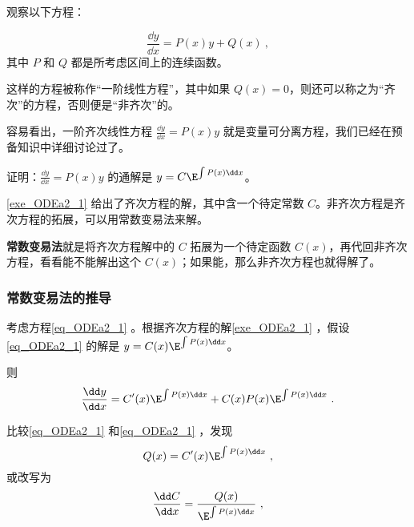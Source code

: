 

观察以下方程：

\begin{equation}\label{eq_ODEa2_1}
\frac{\dd y}{\dd x}=P(x)y+Q(x)~,
\end{equation}
其中 $P$ 和 $Q$ 都是所考虑区间上的连续函数。

这样的方程被称作“一阶线性方程”，其中如果 $Q(x)=0$，则还可以称之为“齐次”的方程，否则便是“非齐次”的。

容易看出，一阶齐次线性方程 $\frac{\dd y}{\dd x}=P(x)y$ 就是变量可分离方程，我们已经在预备知识中详细讨论过了。

\begin{exercise}{}\label{exe_ODEa2_1}
证明：$\frac{\dd y}{\dd x}=P(x)y$ 的通解是 $y=C\E^{\int P(x)\dd x}$。
\end{exercise}

\autoref{exe_ODEa2_1} 给出了齐次方程的解，其中含一个待定常数 $C$。非齐次方程是齐次方程的拓展，可以用常数变易法来解。

\textbf{常数变易法}就是将齐次方程解中的 $C$ 拓展为一个待定函数 $C(x)$，再代回非齐次方程，看看能不能解出这个 $C(x)$；如果能，那么非齐次方程也就得解了。

\subsubsection{常数变易法的推导}
考虑方程\autoref{eq_ODEa2_1} 。根据齐次方程的解\autoref{exe_ODEa2_1} ，假设\autoref{eq_ODEa2_1} 的解是 $y=C(x)\E^{\int P(x)\dd x}$。

则
\begin{equation}
\begin{aligned}
\frac{\dd y}{\dd x}=C'(x)\E^{\int P(x)\dd x}+C(x)P(x)\E^{\int P(x)\dd x}~.
\end{aligned}
\end{equation}

比较\autoref{eq_ODEa2_1} 和\autoref{eq_ODEa2_1} ，发现
\begin{equation}
Q(x)=C'(x)\E^{\int P(x)\dd x}~,
\end{equation}
或改写为
\begin{equation}
\frac{\dd C}{\dd x}=\frac{Q(x)}{\E^{\int P(x)\dd x}}~,
\end{equation}

